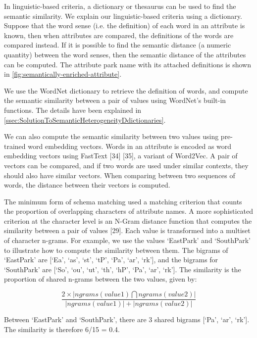 In linguistic-based criteria, a dictionary or thesaurus can be used to find the semantic similarity. We explain our linguistic-based criteria using a dictionary. Suppose that the word sense (i.e. the definition) of each word in an attribute is known, then when attributes are compared, the definitions of the words are compared instead. If it is possible to find the semantic distance (a numeric quantity) between the word senses, then the semantic distance of the attributes can be computed. The attribute park name with its attached definitions is shown in \autoref{fig:semantically-enriched-attribute}.

We use the WordNet dictionary to retrieve the definition of words, and compute the semantic similarity between a pair of values using WordNet's built-in functions. The details have been explained in \autoref{ssec:SolutionToSemanticHeterogeneityDdictionaries}.

We can also compute the semantic similarity between two values using pre-trained word embedding vectors. Words in an attribute is encoded as word embedding vectors using FastText \cite{Mudgal2018Deep}[34] \cite{Nargesian2018Table}[35], a variant of Word2Vec. A pair of vectors can be compared, and if two words are used under similar contexts, they should also have similar vectors. When comparing between two sequences of words, the distance between their vectors is computed.

The minimum form of schema matching used a matching criterion that counts the proportion of overlapping characters of attribute names. A more sophisticated criterion at the character level is an N-Gram distance function that computes the similarity between a pair of values \cite{loper-bird-2002-nltk}[29]. Each value is transformed into a multiset of character n-grams. For example, we use the values `EastPark' and `SouthPark' to illustrate how to compute the similarity between them. The bigrams of `EastPark' are [`Ea', `as', `st', `tP', `Pa', `ar', `rk'], and the bigrams for `SouthPark' are [`So', `ou', `ut', `th', `hP', `Pa', `ar', `rk']. The similarity is the proportion of shared n-grams between the two values, given by:

\[
\frac{2\times|ngrams(value1)\bigcap ngrams(value2)|}{|ngrams(value1)|+|ngrams(value2)|}
\]

Between `EastPark' and `SouthPark', there are 3 shared bigrams [`Pa', `ar', `rk']. The similarity is therefore 6/15 = 0.4.

